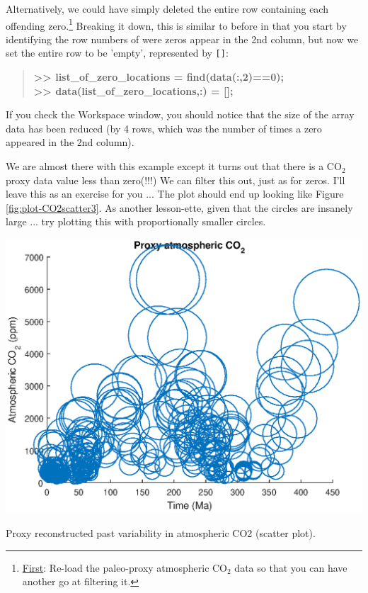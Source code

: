 \documentclass{tufte-book} %
\newenvironment{docspecbold}{\begin{quotation}\ttfamily\bfseries\parskip0pt\parindent0pt\ignorespaces}{\end{quotation}}
\begin{document}
Alternatively, we could have simply deleted the entire row containing each offending zero.\footnote{\uline{First}: Re-load  the paleo-proxy atmospheric CO\(_{2}\) data so that you can have another go at filtering it.} Breaking it down, this is similar to before in that you start by identifying the row numbers of were zeros appear in the 2nd column, but now we set the entire row to be 'empty', represented by \texttt{[]}:
\begin{docspecbold}
>> list\_of\_zero\_locations = find(data(:,2)==0);
\\ >> data(list\_of\_zero\_locations,:) = [];
\end{docspecbold}
If you check the \textsf{Workspace window}, you should notice that the size of the array data has been reduced (by 4 rows, which was the number of times a zero appeared in the 2nd column).

We are almost there with this example except it turns out that there is a CO\(_{2}\) proxy data value less than zero(!!!) We can filter this out, just as for zeros. I'll leave this as an exercise for you ... The plot should end up looking like Figure \ref{fig:plot-CO2scatter3}. As another lesson-ette, given that the circles are insanely large ... try plotting this with proportionally smaller circles.

\begin{marginfigure}[0.0in]
\includegraphics[width=\linewidth]{plot-CO2scatter3.eps}
\caption{Proxy reconstructed past variability in atmospheric CO2 (scatter plot).}
\label{fig:plot-CO2scatter3}
\end{marginfigure} 
\end{document}
